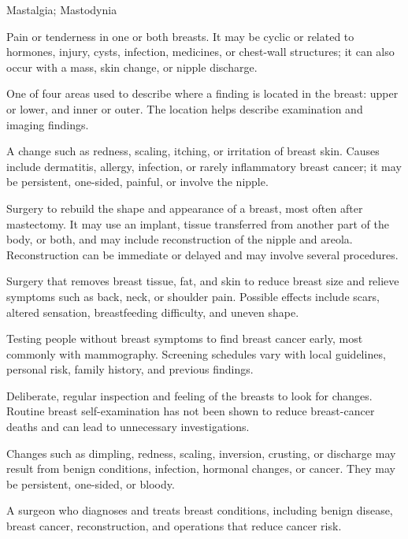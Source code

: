\synonyms
Mastalgia; Mastodynia

 Pain or tenderness in one or both breasts. It may be cyclic or related to hormones, injury, cysts, infection, medicines, or chest-wall structures; it can also occur with a mass, skin change, or nipple discharge.

 One of four areas used to describe where a finding is located in the breast: upper or lower, and inner or outer. The location helps describe examination and imaging findings.

 A change such as redness, scaling, itching, or irritation of breast skin. Causes include dermatitis, allergy, infection, or rarely inflammatory breast cancer; it may be persistent, one-sided, painful, or involve the nipple.

 Surgery to rebuild the shape and appearance of a breast, most often after mastectomy. It may use an implant, tissue transferred from another part of the body, or both, and may include reconstruction of the nipple and areola. Reconstruction can be immediate or delayed and may involve several procedures.

 Surgery that removes breast tissue, fat, and skin to reduce breast size and relieve symptoms such as back, neck, or shoulder pain. Possible effects include scars, altered sensation, breastfeeding difficulty, and uneven shape.

 Testing people without breast symptoms to find
breast cancer early, most commonly with mammography. Screening schedules vary
with local guidelines, personal risk, family history, and previous findings.

 Deliberate, regular inspection and feeling of
the breasts to look for changes. Routine breast self-examination has not been
shown to reduce breast-cancer deaths and can lead to unnecessary investigations.

 Changes such as dimpling, redness, scaling, inversion, crusting, or discharge may result from benign conditions, infection, hormonal changes, or cancer. They may be persistent, one-sided, or bloody.

 A surgeon who diagnoses and treats breast conditions, including benign disease, breast cancer, reconstruction, and operations that reduce cancer risk.

